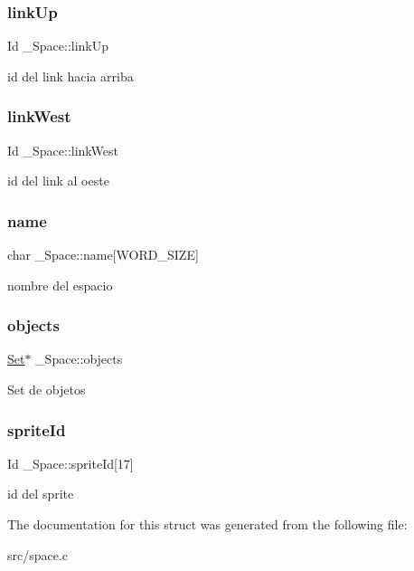 \subsubsection{\texorpdfstring{link\+Up}{linkUp}}
{\footnotesize\ttfamily Id \+\_\+\+Space\+::link\+Up}

id del link hacia arriba \mbox{\label{struct__Space_aaa6f5fa10a67afc466e3b272099dc398}} 
\subsubsection{\texorpdfstring{link\+West}{linkWest}}
{\footnotesize\ttfamily Id \+\_\+\+Space\+::link\+West}

id del link al oeste \mbox{\label{struct__Space_a4e8775f2ba9ae19392f9942dbb5f5ec0}} 
\subsubsection{\texorpdfstring{name}{name}}
{\footnotesize\ttfamily char \+\_\+\+Space\+::name\mbox{[}W\+O\+R\+D\+\_\+\+S\+I\+ZE\mbox{]}}

nombre del espacio \mbox{\label{struct__Space_a661ed8b0fc8085b6db70188aa5085625}} 
\subsubsection{\texorpdfstring{objects}{objects}}
{\footnotesize\ttfamily \hyperlink{struct__Set}{Set}$\ast$ \+\_\+\+Space\+::objects}

Set de objetos \mbox{\label{struct__Space_a5a86c929d4043837ee01ea1b14749970}} 
\subsubsection{\texorpdfstring{sprite\+Id}{spriteId}}
{\footnotesize\ttfamily Id \+\_\+\+Space\+::sprite\+Id\mbox{[}17\mbox{]}}

id del sprite 

The documentation for this struct was generated from the following file\+:\begin{DoxyCompactItemize}
\item 
src/space.\+c\end{DoxyCompactItemize}
